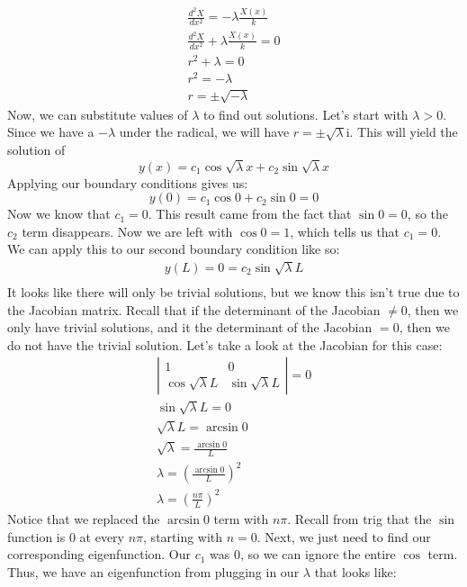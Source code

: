 \documentclass{article}
\begin{document}
\begin{gather*}
\frac{d^{2}X}{dx^{2}} = -\lambda \frac{X(x)}{k}\\
\frac{d^{2}X}{dx^{2}}  + \lambda \frac{X(x)}{k} = 0\\
r^{2} + \lambda = 0\\
r^{2} = -\lambda\\
r = \pm \sqrt{- \lambda}
\end{gather*}
\indent Now, we can substitute values of $\lambda$ to find out solutions. Let's start with $\lambda > 0$. Since we have a $-\lambda$ under the radical, we will have $r = \pm \sqrt{\lambda} \mathrm{i}$. This will yield the solution of 
\[
y(x) = c_{1}\cos{\sqrt{\lambda}x} + c_{2}\sin{\sqrt{\lambda}x}
\]
\noindent Applying our boundary conditions gives us:
\[
y(0) = c_{1}\cos{0} + c_{2}\sin{0} = 0
\]
\noindent Now we know that $c_{1} = 0$. This result came from the fact that $\sin{0} = 0$, so the $c_{2}$ term disappears. Now we are left with $\cos{0} = 1$, which tells us that $c_{1} = 0$. We can apply this to our second boundary condition like so:
\begin{gather*}
y(L) = 0 = c_{2}\sin{\sqrt{\lambda}L}\\
\end{gather*}
\noindent It looks like there will only be trivial solutions, but we know this isn't true due to the Jacobian matrix. Recall that if the determinant of the Jacobian $\neq 0$, then we only have trivial solutions, and it the determinant of the Jacobian $= 0$, then we do not have the trivial solution. Let's take a look at the Jacobian for this case: 
\begin{gather*}
\left| 
\begin{array}{cc}
1 & 0\\
\cos{\sqrt{\lambda}L} & \sin{\sqrt{\lambda}L}
\end{array}
\right| = 0\\
\sin{\sqrt{\lambda}L} = 0\\
\sqrt{\lambda}L = \arcsin{0}\\
\sqrt{\lambda} = \frac{\arcsin{0}}{L}\\
\lambda = \left(\frac{\arcsin{0}}{L}\right)^{2}\\
\lambda = \left(\frac{n\pi}{L}\right)^{2}
\end{gather*}
\noindent Notice that we replaced the $\arcsin{0}$ term with $n\pi$. Recall from trig that the $\sin$ function is $0$ at every $n\pi$, starting with $n = 0$. Next, we just need to find our corresponding eigenfunction. Our $c_{1}$ was $0$, so we can ignore the entire $\cos$ term. Thus, we have an eigenfunction from plugging in our $\lambda$ that looks like:
\end{document}
